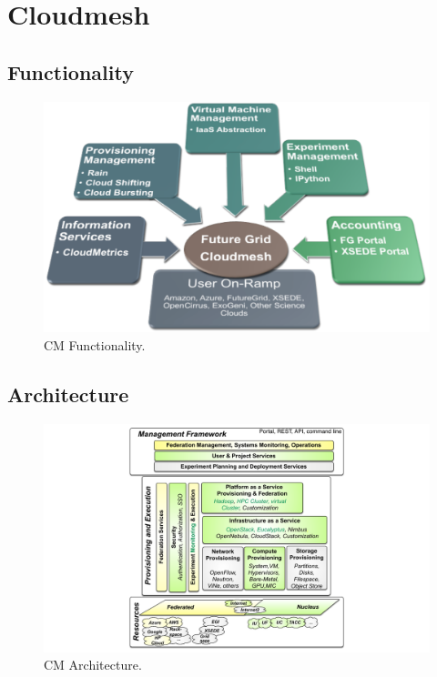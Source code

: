 
\section{Cloudmesh}\label{S:cloudmesh}

\subsection{Functionality}

\begin{figure}[h!]
  \centering
    \includegraphics[width=1.0\textwidth]{images/cm-functionality.pdf}
  \caption{CM Functionality.}
\end{figure}

\subsection{Architecture}

\begin{figure}[h!]
  \centering
    \includegraphics[width=1.0\textwidth]{images/cm-arch.pdf}
  \caption{CM Architecture.}
\end{figure}


